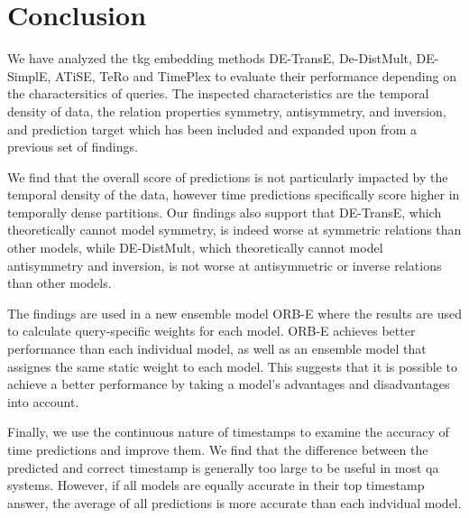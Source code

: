 \section{Conclusion}
\label{sec:conclusion}

We have analyzed the \gls{tkg} embedding methods DE-TransE, De-DistMult, DE-SimplE, ATiSE, TeRo and TimePlex to evaluate their performance depending on the charactersitics of queries.
The inspected characteristics are the temporal density of data, the relation properties symmetry, antisymmetry, and inversion, and prediction target which has been included and expanded upon from a previous set of findings.

We find that the overall score of predictions is not particularly impacted by the temporal density of the data, however time predictions specifically score higher in temporally dense partitions.
Our findings also support that DE-TransE, which theoretically cannot model symmetry, is indeed worse at symmetric relations than other models, while DE-DistMult, which theoretically cannot model antisymmetry and inversion, is not worse at antisymmetric or inverse relations than other models.

The findings are used in a new ensemble model ORB-E where the results are used to calculate query-specific weights for each model. ORB-E achieves better performance than each individual model, as well as an ensemble model that assignes the same static weight to each model.
This suggests that it is possible to achieve a better performance by taking a model's advantages and disadvantages into account.

Finally, we use the continuous nature of timestamps to examine the accuracy of time predictions and improve them.
We find that the difference between the predicted and correct timestamp is generally too large to be useful in most \gls{qa} systems.
However, if all models are equally accurate in their top timestamp answer, the average of all predictions is more accurate than each indvidual model.